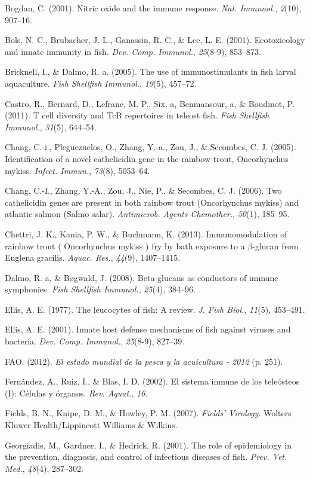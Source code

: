 \documentclass[12pt,a4paper,]{article}
\begin{document}
Bogdan, C. (2001). Nitric oxide and the immune response. \emph{Nat.
Immunol.}, \emph{2}(10), 907--16.

Bols, N. C., Brubacher, J. L., Ganassin, R. C., \& Lee, L. E. (2001).
Ecotoxicology and innate immunity in fish. \emph{Dev. Comp. Immunol.},
\emph{25}(8-9), 853--873.

Bricknell, I., \& Dalmo, R. a. (2005). The use of immunostimulants in
fish larval aquaculture. \emph{Fish Shellfish Immunol.}, \emph{19}(5),
457--72.

Castro, R., Bernard, D., Lefranc, M. P., Six, a, Benmansour, a, \&
Boudinot, P. (2011). T cell diversity and TcR repertoires in teleost
fish. \emph{Fish Shellfish Immunol.}, \emph{31}(5), 644--54.

Chang, C.-i., Pleguezuelos, O., Zhang, Y.-a., Zou, J., \& Secombes, C.
J. (2005). Identification of a novel cathelicidin gene in the rainbow
trout, Oncorhynchus mykiss. \emph{Infect. Immun.}, \emph{73}(8),
5053--64.

Chang, C.-I., Zhang, Y.-A., Zou, J., Nie, P., \& Secombes, C. J. (2006).
Two cathelicidin genes are present in both rainbow trout (Oncorhynchus
mykiss) and atlantic salmon (Salmo salar). \emph{Antimicrob. Agents
Chemother.}, \emph{50}(1), 185--95.

Chettri, J. K., Kania, P. W., \& Buchmann, K. (2013). Immunomodulation
of rainbow trout ( Oncorhynchus mykiss ) fry by bath exposure to a
$\beta$-glucan from Euglena gracilis. \emph{Aquac. Res.}, \emph{44}(9),
1407--1415.

Dalmo, R. a, \& Bøgwald, J. (2008). Beta-glucans as conductors of immune
symphonies. \emph{Fish Shellfish Immunol.}, \emph{25}(4), 384--96.

Ellis, A. E. (1977). The leucocytes of fish: A review. \emph{J. Fish
Biol.}, \emph{11}(5), 453--491.

Ellis, A. E. (2001). Innate host defense mechanisms of fish against
viruses and bacteria. \emph{Dev. Comp. Immunol.}, \emph{25}(8-9),
827--39.

FAO. (2012). \emph{El estado mundial de la pesca y la acuicultura -
2012} (p. 251).

Fernández, A., Ruiz, I., \& Blas, I. D. (2002). El sistema inmune de los
teleósteos (I): Células y órganos. \emph{Rev. Aquat.}, \emph{16}.

Fields, B. N., Knipe, D. M., \& Howley, P. M. (2007). \emph{Fields'
Virology}. Wolters Kluwer Health/Lippincott Williams \& Wilkins.

Georgiadis, M., Gardner, I., \& Hedrick, R. (2001). The role of
epidemiology in the prevention, diagnosis, and control of infectious
diseases of fish. \emph{Prev. Vet. Med.}, \emph{48}(4), 287--302.
\end{document}
